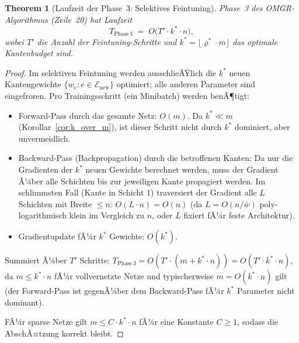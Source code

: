 ﻿\documentclass[12pt, a4paper, openany]{report}
\newtheorem{theorem}{Theorem}[chapter]
\newcommand{\calE}{\mathcal{E}}
\begin{document}
\begin{theorem}[Laufzeit der Phase~3: Selektives Feintuning]
\label{thm:runtime_phase3}
Phase~3 des OMGR-Algorithmus (Zeile~20) hat Laufzeit
\begin{equation}
  \label{eq:runtime_phase3}
  T_{\mathrm{Phase\,3}} \;=\; O\!\bigl(T' \cdot k^* \cdot n\bigr),
\end{equation}
wobei $T'$ die Anzahl der Feintuning-Schritte und
$k^* = \lfloor\varrho^* \cdot m\rfloor$ das optimale Kantenbudget sind.
\end{theorem}

\begin{proof}
Im selektiven Feintuning werden ausschlieÃŸlich die $k^*$ neuen Kantengewichte
$\{w_e : e \in \calE_{\mathrm{new}}\}$ optimiert; alle anderen Parameter sind eingefroren.
Pro Trainingsschritt (ein Minibatch) werden benÃ¶tigt:
\begin{itemize}
  \item Forward-Pass durch das gesamte Netz: $O(m)$.  Da $k^* \ll m$
    (Korollar~\ref{cor:k_over_m}), ist dieser Schritt nicht durch $k^*$
    dominiert, aber unvermeidlich.
  \item Backward-Pass (Backpropagation) durch die betroffenen Kanten:
    Da nur die Gradienten der $k^*$ neuen Gewichte berechnet werden,
    muss der Gradient Ã¼ber alle Schichten bis zur jeweiligen Kante
    propagiert werden.  Im schlimmsten Fall (Kante in Schicht $1$)
    traversiert der Gradient alle $L$ Schichten mit Breite $\leq n$:
    $O(L \cdot n) = O(n)$ (da $L = O(n/\bar{w})$ poly-logarithmisch klein
    im Vergleich zu $n$, oder $L$ fixiert fÃ¼r feste Architektur).
  \item Gradientupdate fÃ¼r $k^*$ Gewichte: $O(k^*)$.
\end{itemize}
Summiert Ã¼ber $T'$ Schritte: $T_{\mathrm{Phase\,3}} = O(T' \cdot (m + k^* \cdot n))
= O(T' \cdot k^* \cdot n)$, da $m \leq k^* \cdot n$ fÃ¼r vollvernetzte Netze
und typischerweise $m = O(k^* \cdot n)$ gilt (der Forward-Pass ist
gegenÃ¼ber dem Backward-Pass fÃ¼r $k^*$ Parameter nicht dominant).

FÃ¼r sparse Netze gilt $m \leq C \cdot k^* \cdot n$ fÃ¼r eine Konstante $C \geq 1$,
sodass die AbschÃ¤tzung korrekt bleibt.
\end{proof}
\end{document}
